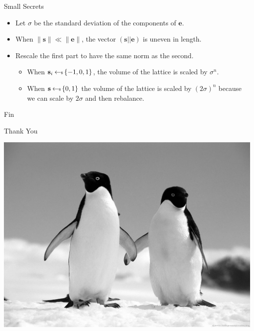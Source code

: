 \documentclass[presentation,smaller]{beamer}
\renewcommand{\vec}[1]{\mathbf{#1}\xspace}
\begin{document}
\begin{frame}[label={sec:org1d4dbc9}]{Small Secrets}
\begin{itemize}
\item Let \(σ\) be the standard deviation of the components of \(\vec{e}\).
\item When \(\|\vec{s}\| \ll \|\vec{e}\|\), the vector \((\vec{s} || \vec{e})\) is uneven in length.
\item Rescale the first part to have the same norm as the second. 
\begin{itemize}
\item When \(\vec{s}_i \sample \{-1,0,1\}\), the volume of the lattice is scaled by \(σ^n\).
\item When \(\vec{s} \sample \{0,1\}\) the volume of the lattice is scaled by \({(2σ)}^n\) because we can scale by \(2σ\) and then rebalance.
\end{itemize}
\end{itemize}
\end{frame}
\begin{frame}[standout,label={sec:org9f4a80a}]{Fin}
\begin{center}
\Huge \alert{Thank You}
\end{center}

\begin{center}
\includegraphics[width=0.6\paperwidth]{./kitten-03.jpg}
\end{center}
\end{frame}
\end{document}
